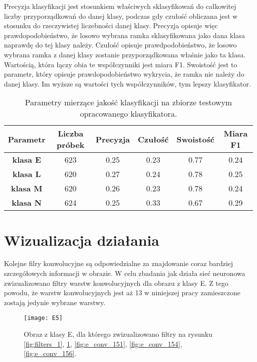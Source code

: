 {Precyzja klasyfikacji jest stosunkiem właściwych sklasyfikowań do całkowitej liczby przyporządkowań do danej klasy, podczas gdy czułość obliczana jest w stosunku do rzeczywistej liczebności danej klasy. Precyzja opisuje więc prawdopodobieństwo, że losowo wybrana ramka sklasyfikowana jako dana klasa naprawdę do tej klasy należy. Czułość opisuje prawdpodobieństwo, że losowo wybrana ramka z danej klasy zostanie przyporządkowana właśnie jako ta klasa. Wartością, która łączy obia te współczynniki jest miara F1. Swoistość jest to parametr, który opisuje prawdopodobieństwo wykrycia, że ramka nie należy do danej klasy. Im wyższe są wartości tych współczynników, tym lepszy klasyfikator.

\begin{table}[h!]
\centering
\caption[Short Heading]{Parametry mierzące jakość klasyfikacji na zbiorze testowym opracowanego klasyfikatora.}
\label{tab:params_test}
\begin{tabular}{|c|c|c|c|c|c|}
\hline
\textbf{Parametr}                              & \textbf{Liczba próbek} & \textbf{Precyzja} & \textbf{Czułość} & \textbf{Swoistość} & \textbf{Miara F1} \\ \hline
\textbf{klasa E} & 623 & 0.25   & 0.23   & 0.77 & 0.24  \\ \hline
\textbf{klasa L} & 620 & 0.27  & 0.24 & 0.78 & 0.25 \\ \hline
\textbf{klasa M}  & 620 & 0.26   & 0.23    & 0.78 & 0.24  \\ \hline
\textbf{klasa N}  & 624 & 0.25   & 0.33   & 0.67 & 0.29\\ \hline
\end{tabular}
\end{table}
}

\section{Wizualizacja działania}

Kolejne filry konwolucyjne są odpowiedzialne za znajdowanie coraz bardziej szczegółowych informacji w obrazie. W celu zbadania jak działa sieć neuronowa zwizualizowano filtry warstw konwolucyjnych dla obrazu z klasy E. Z tego powodu, że warstw konwolucyjnych jest aż 13 w niniejszej pracy zamieszczone zostają jedynie wybrane warstwy.

\begin{figure}[h!]
	\centering
	\centering
		\texttt{[image: E5]}	
	\caption{Obraz z klasy E, dla którego zwizualizowano filtry na rysunku \ref{fig:filters_1}, \ref{fig:e_conv_148},   \ref{fig:e_conv_151},  \ref{fig:e_conv_154},  \ref{fig:e_conv_156}.}\label{fig:e_conv_148}
\end{figure}

